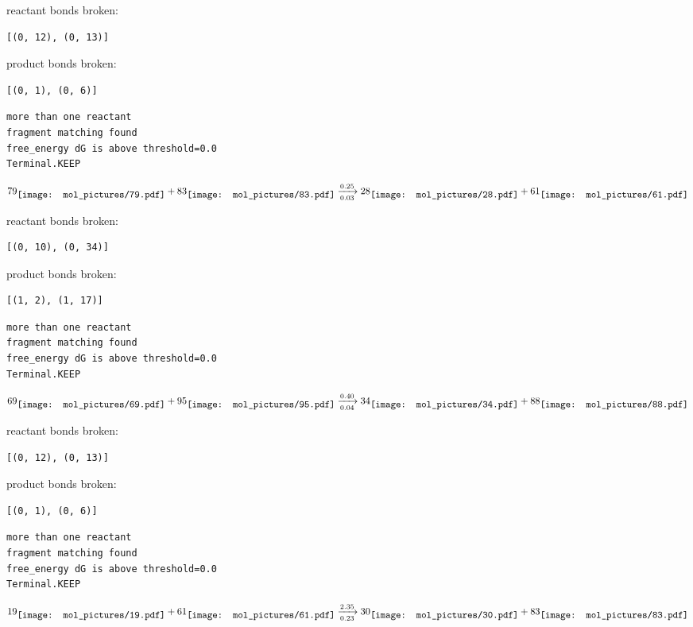 \documentclass{article}
\begin{document}
reactant bonds broken:\begin{verbatim}
[(0, 12), (0, 13)]
\end{verbatim}
product bonds broken:\begin{verbatim}
[(0, 1), (0, 6)]
\end{verbatim}




\vspace{1cm}
\begin{verbatim}
more than one reactant
fragment matching found
free_energy dG is above threshold=0.0
Terminal.KEEP
\end{verbatim}
$$
79
\raisebox{-.5\height}{\texttt{[image: mol\_pictures/79.pdf]}}
+
83
\raisebox{-.5\height}{\texttt{[image: mol\_pictures/83.pdf]}}
\xrightarrow[0.03]{0.25}
28
\raisebox{-.5\height}{\texttt{[image: mol\_pictures/28.pdf]}}
+
61
\raisebox{-.5\height}{\texttt{[image: mol\_pictures/61.pdf]}}
$$


reactant bonds broken:\begin{verbatim}
[(0, 10), (0, 34)]
\end{verbatim}
product bonds broken:\begin{verbatim}
[(1, 2), (1, 17)]
\end{verbatim}




\vspace{1cm}
\begin{verbatim}
more than one reactant
fragment matching found
free_energy dG is above threshold=0.0
Terminal.KEEP
\end{verbatim}
$$
69
\raisebox{-.5\height}{\texttt{[image: mol\_pictures/69.pdf]}}
+
95
\raisebox{-.5\height}{\texttt{[image: mol\_pictures/95.pdf]}}
\xrightarrow[0.04]{0.40}
34
\raisebox{-.5\height}{\texttt{[image: mol\_pictures/34.pdf]}}
+
88
\raisebox{-.5\height}{\texttt{[image: mol\_pictures/88.pdf]}}
$$


reactant bonds broken:\begin{verbatim}
[(0, 12), (0, 13)]
\end{verbatim}
product bonds broken:\begin{verbatim}
[(0, 1), (0, 6)]
\end{verbatim}




\vspace{1cm}
\begin{verbatim}
more than one reactant
fragment matching found
free_energy dG is above threshold=0.0
Terminal.KEEP
\end{verbatim}
$$
19
\raisebox{-.5\height}{\texttt{[image: mol\_pictures/19.pdf]}}
+
61
\raisebox{-.5\height}{\texttt{[image: mol\_pictures/61.pdf]}}
\xrightarrow[0.23]{2.35}
30
\raisebox{-.5\height}{\texttt{[image: mol\_pictures/30.pdf]}}
+
83
\raisebox{-.5\height}{\texttt{[image: mol\_pictures/83.pdf]}}
$$
\end{document}
